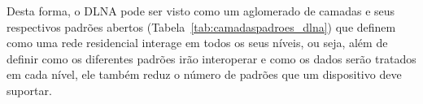 Desta forma, o DLNA pode ser visto como um aglomerado de camadas e seus respectivos padrões abertos (Tabela~\ref{tab:camadaspadroes_dlna}) que definem como uma rede residencial interage em todos os seus níveis, ou seja, além de definir como os diferentes padrões irão interoperar e como os dados serão tratados em cada nível, ele também reduz o número de padrões que um dispositivo deve suportar.

